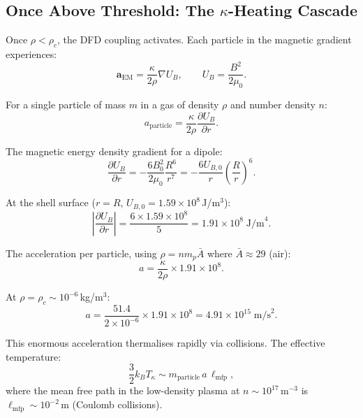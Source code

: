 \documentclass[12pt,a4paper]{article}
\begin{document}
\subsection{Once Above Threshold: The $\kappa$-Heating Cascade}

Once $\rho < \rho_c$, the DFD coupling activates.  Each particle in the magnetic gradient
experiences:
\begin{equation}
  \mathbf{a}_{\text{EM}} = \frac{\kappa}{2\rho} \nabla U_B,
  \qquad U_B = \frac{B^2}{2\mu_0}.
\end{equation}

For a single particle of mass $m$ in a gas of density $\rho$ and number density $n$:
\begin{equation}
  a_{\text{particle}} = \frac{\kappa}{2\rho} \frac{\partial U_B}{\partial r}.
\end{equation}

The magnetic energy density gradient for a dipole:
\begin{equation}
  \frac{\partial U_B}{\partial r} = -\frac{6 B_0^2}{2\mu_0} \frac{R^6}{r^7}
    = -\frac{6 U_{B,0}}{r} \left(\frac{R}{r}\right)^6.
\end{equation}

At the shell surface ($r = R$, $U_{B,0} = 1.59 \times 10^8$\,J/m$^3$):
\begin{equation}
  \left|\frac{\partial U_B}{\partial r}\right| = \frac{6 \times 1.59\times10^8}{5} = 1.91 \times 10^8 \; \text{J/m}^4.
\end{equation}

The acceleration per particle, using $\rho = n m_p \bar{A}$ where $\bar{A} \approx 29$
(air):
\begin{equation}
  a = \frac{\kappa}{2\rho} \times 1.91\times10^8.
\end{equation}

At $\rho = \rho_c \sim 10^{-6}$\,kg/m$^3$:
\begin{equation}
  a = \frac{51.4}{2 \times 10^{-6}} \times 1.91\times10^8 = 4.91 \times 10^{15} \; \text{m/s}^2.
\end{equation}

This enormous acceleration thermalises rapidly via collisions.  The effective temperature:
\begin{equation}
  \frac{3}{2} k_B T_{\kappa} \sim m_{\text{particle}} \, a \, \ell_{\text{mfp}},
\end{equation}
where the mean free path in the low-density plasma at $n \sim 10^{17}$\,m$^{-3}$ is
$\ell_{\text{mfp}} \sim 10^{-2}$\,m (Coulomb collisions).
\end{document}
